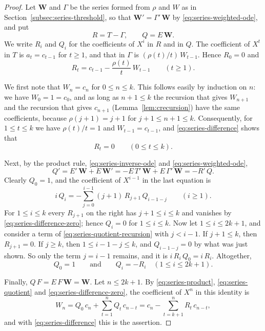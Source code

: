 \documentclass{amsart}
\theoremstyle{definition}
\theoremstyle{remark}
\numberwithin{equation}{section}
\begin{document}
\begin{proof}
Let $\mathbf W$ and $\Gamma$ be the series formed from $\rho$ and $W$ as in
Section~\ref{subsec:series-threshold}, so that
$\mathbf W'=\Gamma'\,\mathbf W$ by \eqref{eq:series-weighted-ode}, and put
\[
R=T-\Gamma,\qquad Q=E\,\mathbf W .
\]
We write $R_i$ and $Q_i$ for the coefficients of $X^i$ in $R$ and in
$Q$. The coefficient of $X^t$ in $T$ is $a_t=c_{t-1}$ for $t\ge1$, and that in
$\Gamma$ is $(\rho(t)/t)\,W_{t-1}$. Hence $R_0=0$ and
\begin{equation}\label{eq:series-difference}
R_t=c_{t-1}-\frac{\rho(t)}{t}\,W_{t-1}\qquad(t\ge1).
\end{equation}

We first note that $W_n=c_n$ for $0\le n\le k$. This follows easily by
induction on $n$: we have $W_0=1=c_0$, and as long as $n+1\le k$ the
recursion that gives $W_{n+1}$ and the recursion that gives $c_{n+1}$
(Lemma~\ref{lem:crecursion}) have the same coefficients, because
$\rho(j+1)=j+1$ for $j+1\le n+1\le k$.
Consequently, for $1\le t\le k$ we have $\rho(t)/t=1$ and
$W_{t-1}=c_{t-1}$, and \eqref{eq:series-difference} shows that
\begin{equation}\label{eq:series-difference-zero}
R_t=0\qquad(0\le t\le k).
\end{equation}

Next, by the product rule, \eqref{eq:series-inverse-ode} and
\eqref{eq:series-weighted-ode},
\[
Q'=E'\,\mathbf W+E\,\mathbf W'=-E\,T'\,\mathbf W+E\,\Gamma'\,\mathbf W
=-R'\,Q .
\]
Clearly $Q_0=1$, and the coefficient of $X^{i-1}$ in the last equation is
\begin{equation}\label{eq:series-quotient-recursion}
i\,Q_i=-\sum_{j=0}^{i-1}(j+1)\,R_{j+1}\,Q_{i-1-j}\qquad(i\ge1).
\end{equation}
For $1\le i\le k$ every $R_{j+1}$ on the right has $j+1\le i\le k$ and
vanishes by \eqref{eq:series-difference-zero}; hence $Q_i=0$ for
$1\le i\le k$. Now let $1\le i\le2k+1$, and consider a term of
\eqref{eq:series-quotient-recursion} with $j<i-1$. If $j+1\le k$, then
$R_{j+1}=0$. If $j\ge k$, then $1\le i-1-j\le k$, and $Q_{i-1-j}=0$ by
what was just shown. So only the term $j=i-1$ remains, and it is
$i\,R_i\,Q_0=i\,R_i$. Altogether,
\begin{equation}\label{eq:series-quotient}
Q_0=1\qquad\text{and}\qquad Q_i=-R_i\quad(1\le i\le2k+1).
\end{equation}

Finally, $Q\,F=E\,F\,\mathbf W=\mathbf W$. Let $n\le2k+1$. By
\eqref{eq:series-product}, \eqref{eq:series-quotient} and
\eqref{eq:series-difference-zero}, the coefficient of $X^n$ in this identity
is
\[
W_n=Q_0\,c_n+\sum_{t=1}^{n}Q_t\,c_{n-t}
=c_n-\sum_{t=k+1}^{n}R_t\,c_{n-t},
\]
and with \eqref{eq:series-difference} this is the assertion.
\end{proof}
\end{document}
